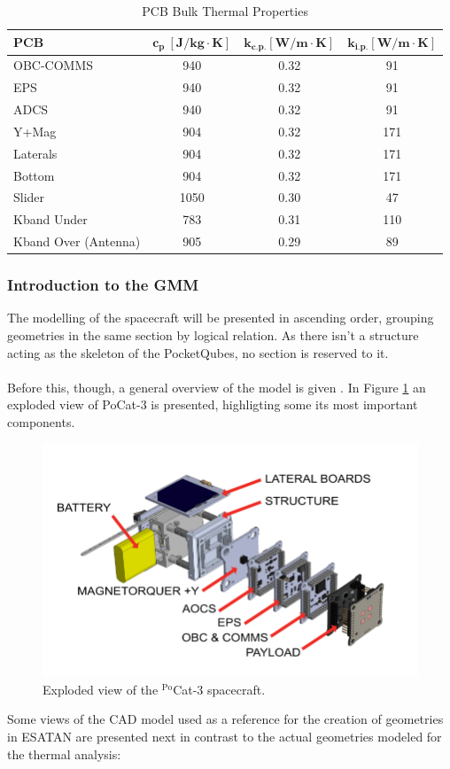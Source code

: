 \begin{table}[H]
  \centering
  \begin{tabular}{lccc}
      \toprule
      \textbf{PCB} & $\mathbf{c_p\ [J/kg\cdot K]}$ & $\mathbf{k_{c.p.} [W/m\cdot K]}$ & $\mathbf{k_{i.p.} [W/m\cdot K]}$ \\
      \midrule
      OBC-COMMS            & 940  & 0.32 & 91  \\
      EPS                  & 940  & 0.32 & 91  \\
      ADCS                 & 940  & 0.32 & 91  \\
      Y+Mag                & 904  & 0.32 & 171 \\
      Laterals             & 904  & 0.32 & 171 \\
      Bottom               & 904  & 0.32 & 171 \\
      Slider               & 1050 & 0.30 & 47  \\
      Kband Under          & 783  & 0.31 & 110 \\
      Kband Over (Antenna) & 905  & 0.29 & 89  \\
      \bottomrule
  \end{tabular}
  \caption{PCB Bulk Thermal Properties}
\end{table}


\subsubsection{Introduction to the GMM}

The modelling of the spacecraft will be presented in ascending order,
grouping geometries in the same section by logical relation. As there
isn't a structure acting as the skeleton of the PocketQubes, no section
is reserved to it.
\paragraph{}
Before this, though, a general overview of the model is given .
In Figure \ref{fig:explodedview} an exploded view of PoCat-3 is presented, 
highligting some its most important components.

\begin{figure}[H]
    \centering
    \includegraphics[width=0.6\linewidth]{res/img/5_simulationanalisys/exploded.PNG}
    \caption{Exploded view of the $^{\text{Po}}$Cat-3 spacecraft.}
    \label{fig:explodedview}
\end{figure}
Some views of the CAD model used as a reference for the creation of geometries in ESATAN
are presented next in contrast to the actual geometries modeled for the thermal analysis:

